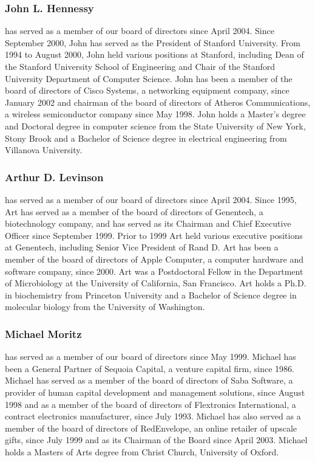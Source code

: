 \documentclass[a4paper,12pt]{article}
\begin{document}
\subsubsection{John L. Hennessy}

has served as a member of our board of directors since
April 2004. Since September 2000, John has served as the President of
Stanford University. From 1994 to August 2000, John held various
positions at Stanford, including Dean of the Stanford University School
of Engineering and Chair of the Stanford University Department of
Computer Science. John has been a member of the board of directors of
Cisco Systems, a networking equipment company, since January 2002 and
chairman of the board of directors of Atheros Communications, a wireless
semiconductor company since May 1998. John holds a Master's degree and
Doctoral degree in computer science from the State University of New
York, Stony Brook and a Bachelor of Science degree in electrical
engineering from Villanova University.

\subsubsection{Arthur D. Levinson}

has served as a member of our board of directors
since April 2004. Since 1995, Art has served as a member of the board of
directors of Genentech, a biotechnology company, and has served as its
Chairman and Chief Executive Officer since September 1999. Prior to 1999
Art held various executive positions at Genentech, including Senior Vice
President of Rand D. Art has been a member of the board of directors of
Apple Computer, a computer hardware and software company, since 2000.
Art was a Postdoctoral Fellow in the Department of Microbiology at the
University of California, San Francisco. Art holds a Ph.D. in
biochemistry from Princeton University and a Bachelor of Science degree
in molecular biology from the University of Washington.

\subsubsection{Michael Moritz}

has served as a member of our board of directors since
May 1999. Michael has been a General Partner of Sequoia Capital, a
venture capital firm, since 1986. Michael has served as a member of the
board of directors of Saba Software, a provider of human capital
development and management solutions, since August 1998 and as a member
of the board of directors of Flextronics International, a contract
electronics manufacturer, since July 1993. Michael has also served as a
member of the board of directors of RedEnvelope, an online retailer of
upscale gifts, since July 1999 and as its Chairman of the Board since
April 2003. Michael holds a Masters of Arts degree from Christ Church,
University of Oxford.
\end{document}
